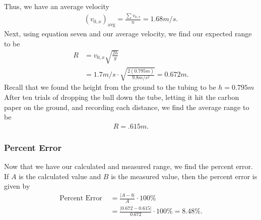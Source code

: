 \documentclass{report}
\begin{document}
    \bigbreak \noindent 
    Thus, we have an average velocity
    \begin{align*}
        (v_{0,x})_{\text{avg}} = \frac{\sum v_{0,x}}{n} = 1.68 m/s
    .\end{align*}
    \bigbreak \noindent 
    Next, using equation seven and our average velocity, we find our expected range to be
    \begin{align*}
        R &= v_{0,x}\sqrt{\frac{2h}{g}} \\
        &=1.7 m/s \cdot \sqrt{\frac{2(0.795 m)}{9.8 m/s^{2}}} = 0.672 m
    .\end{align*}
    \bigbreak \noindent 
    Recall that we found the height from the ground to the tubing to be $h=0.795m$
    \bigbreak \noindent 
    After ten trials of dropping the ball down the tube, letting it hit the carbon paper on the ground, and recording each distance, we find the average range to be
    \begin{align*}
        R = .615m
    .\end{align*}
    \bigbreak \noindent 
    \subsubsection{Percent Error}
    \bigbreak \noindent 
    Now that we have our calculated and measured range, we find the percent error. If $A$ is the calculated value and $B$ is the measured value, then the percent error is given by
    \begin{align*}
        \text{Percent Error } &= \frac{\bigg\lvert A-b \bigg\rvert}{A} \cdot 100\% \\
       &=\frac{\bigg\lvert 0.672-0.615 \bigg\rvert}{0.672} \cdot 100\% = 8.48\%
    .\end{align*}








    \bigbreak \noindent 
\end{document}
